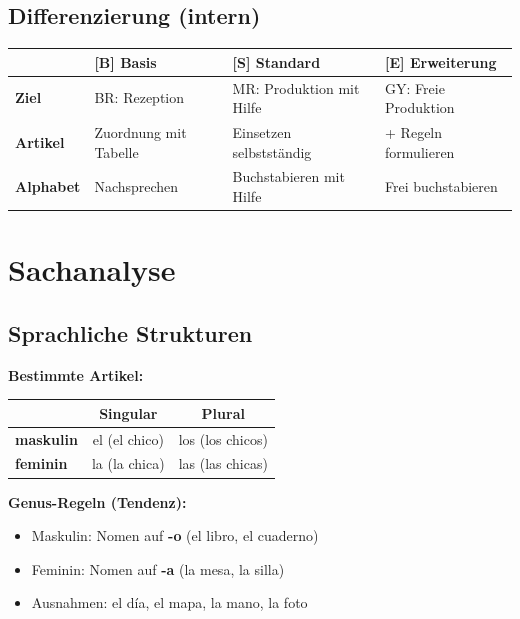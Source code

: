 \documentclass[11pt,a4paper]{article}
\newcommand{\B}{\textcolor{basis}{\textbf{[B]}}}
\newcommand{\Std}{\textcolor{standard}{\textbf{[S]}}}
\newcommand{\E}{\textcolor{erweiterung}{\textbf{[E]}}}
\begin{document}
\subsection{Differenzierung (intern)}
\begin{tabular}{|l|p{3.5cm}|p{3.5cm}|p{3.5cm}|}
\hline
& \B{} \textbf{Basis} & \Std{} \textbf{Standard} & \E{} \textbf{Erweiterung} \\
\hline
\textbf{Ziel} & BR: Rezeption & MR: Produktion mit Hilfe & GY: Freie Produktion \\
\hline
\textbf{Artikel} & Zuordnung mit Tabelle & Einsetzen selbstständig & + Regeln formulieren \\
\hline
\textbf{Alphabet} & Nachsprechen & Buchstabieren mit Hilfe & Frei buchstabieren \\
\hline
\end{tabular}

\section{Sachanalyse}

\subsection{Sprachliche Strukturen}

\textbf{Bestimmte Artikel:}
\begin{center}
\begin{tabular}{|l|c|c|}
\hline
& \textbf{Singular} & \textbf{Plural} \\
\hline
\textbf{maskulin} & el (el chico) & los (los chicos) \\
\hline
\textbf{feminin} & la (la chica) & las (las chicas) \\
\hline
\end{tabular}
\end{center}

\textbf{Genus-Regeln (Tendenz):}
\begin{itemize}
    \item Maskulin: Nomen auf \textbf{-o} (el libro, el cuaderno)
    \item Feminin: Nomen auf \textbf{-a} (la mesa, la silla)
    \item Ausnahmen: el día, el mapa, la mano, la foto
\end{itemize}
\end{document}
